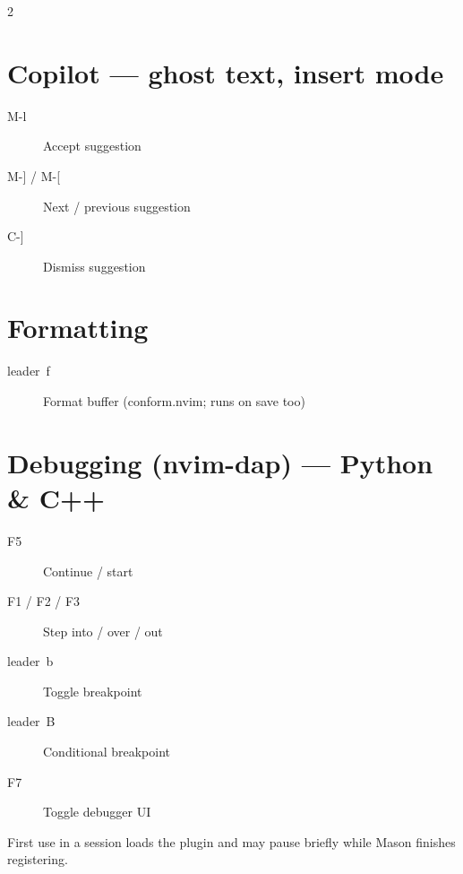 \documentclass[14pt]{extarticle}
\newcommand{\key}[1]{\colorbox{keybg}{\ttfamily\small\mbox{#1}}}
\begin{document}
\begin{multicols}{2}
\section{Copilot --- ghost text, insert mode}
\begin{description}
  \item[\key{M-l}] Accept suggestion
  \item[\key{M-]} / \key{M-[}] Next / previous suggestion
  \item[\key{C-]}] Dismiss suggestion
\end{description}

\section{Formatting}
\begin{description}
  \item[\key{leader f}] Format buffer (conform.nvim; runs on save too)
\end{description}

\section{Debugging (nvim-dap) --- Python \& C++}
\begin{description}
  \item[\key{F5}] Continue / start
  \item[\key{F1} / \key{F2} / \key{F3}] Step into / over / out
  \item[\key{leader b}] Toggle breakpoint
  \item[\key{leader B}] Conditional breakpoint
  \item[\key{F7}] Toggle debugger UI
\end{description}
{\small\color{note} First use in a session loads the plugin and may pause briefly while Mason finishes registering.}


\end{multicols}
\end{document}
